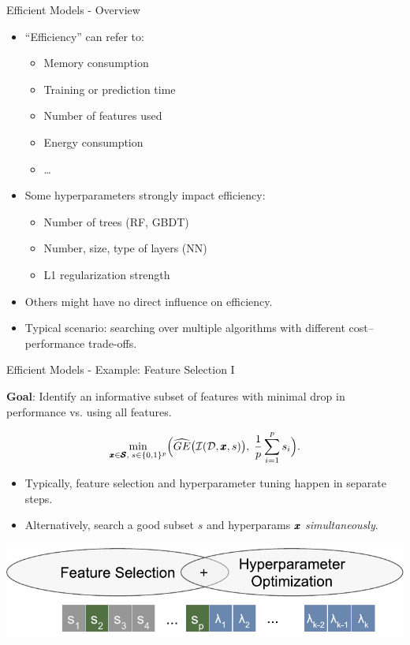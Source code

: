 \documentclass[11pt,compress,t,notes=noshow,xcolor=table]{beamer}
\newcommand{\inducer}{\mathcal{I}}
\begin{document}
\begin{vbframe}{Efficient Models - Overview}

\begin{itemize}
  \item “Efficiency” can refer to:
    \begin{itemize}
      \item Memory consumption
      \item Training or prediction time
      \item Number of features used
      \item Energy consumption
      \item \ldots
    \end{itemize}
  \item Some hyperparameters strongly impact efficiency:
    \begin{itemize}
      \item Number of trees (RF, GBDT)
      \item Number, size, type of layers (NN)
      \item L1 regularization strength
    \end{itemize}
  \item Others might have no direct influence on efficiency.
  \item Typical scenario: searching over multiple algorithms with different cost–performance trade-offs.
\end{itemize}

\end{vbframe}

\begin{vbframe}{Efficient Models - Example: Feature Selection I}

\textbf{Goal}: Identify an informative subset of features with minimal drop in performance vs. using all features.

\[
\min_{\conf\in \pcs,\; s\in \{0,1\}^p}
  \Bigl(
    \widehat{GE}\bigl(\inducer(\dataset,\conf,s)\bigr),\;
    \frac{1}{p}\sum_{i=1}^p s_i
  \Bigr).
\]

\begin{itemize}
  \item Typically, feature selection and hyperparameter tuning happen in separate steps.
  \item Alternatively, search a good subset $s$ and hyperparams $\pmb{x}$ \emph{simultaneously}.
\end{itemize}

\begin{center}
\includegraphics[width=0.5\linewidth]{figure_man/mosmafs_presentation_p14.pdf}
\end{center}

\end{vbframe}
\end{document}
